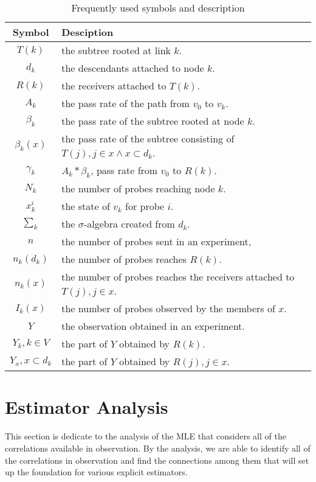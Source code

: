\documentclass[10pt,onecolumn]{IEEEtran}
\begin{document}
\begin{table}[htdp]
\caption{Frequently used symbols and description}
\begin{center}
\begin{tabular}{|c|l|} \hline
Symbol & Desciption \\\hline
$T(k)$ & the subtree rooted at link $k$. \\ \hline
$d_k $& the descendants attached to node $k$. \\\hline
$R(k)$ & the receivers attached to $T(k)$. \\ \hline
$A_k$ & the pass rate of the path from $v_0$ to $v_k$. \\ \hline
$\beta_k$& the pass rate of the subtree rooted at node $k$. \\ \hline
$\beta_k(x)$& the pass rate of the subtree consisting of $T(j), j \in x \land x \subset d_k$. \\\hline
$\gamma_k$& $A_k*\beta_k$, pass rate from $v_0$ to $R(k)$. \\ \hline
$N_k$ & the number of probes reaching node $k$. \\ \hline
$x_k^i$ & the state of $v_k$ for probe $i$.  \\ \hline
$\sum_k$ & the $\sigma$-algebra created from $d_k$. \\ \hline
$n$ & the number of probes sent in an experiment, \\ \hline
$n_k(d_k)$ & the number of probes reaches $R(k)$. \\ \hline
$n_k(x)$ & the number of probes reaches the receivers attached to $T(j), j \in x$. \\ \hline
$I_k(x)$ & the number of probes observed by the members of $x$. \\ \hline
$Y$ &  the observation obtained in an experiment. \\ \hline
$Y_k, k \in V$& the part of $Y$ obtained by $R(k)$. \\ \hline
$Y_x, x \subset d_k$&  the part of $Y$ obtained by $R(j), j \in x$.\\ \hline
\end{tabular}
\end{center}
\label{Frequently used symbols and description}
\end{table}

\section{Estimator Analysis} \label{section3}
This section is dedicate to the analysis of the MLE that considers all of the correlations available in observation. By the analysis, we are able to identify all of the correlations in observation and find the connections among them that will set up the foundation for various explicit estimators.
\end{document}
